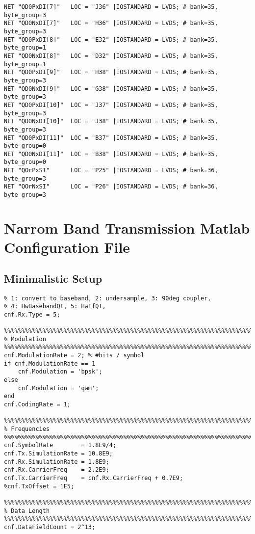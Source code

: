 \begin{appendix}
\begin{verbatim}
NET "QD0PxDI[7]"   LOC = "J36" |IOSTANDARD = LVDS; # bank=35, byte_group=3
NET "QD0NxDI[7]"   LOC = "H36" |IOSTANDARD = LVDS; # bank=35, byte_group=3
NET "QD0PxDI[8]"   LOC = "E32" |IOSTANDARD = LVDS; # bank=35, byte_group=1
NET "QD0NxDI[8]"   LOC = "D32" |IOSTANDARD = LVDS; # bank=35, byte_group=1
NET "QD0PxDI[9]"   LOC = "H38" |IOSTANDARD = LVDS; # bank=35, byte_group=3
NET "QD0NxDI[9]"   LOC = "G38" |IOSTANDARD = LVDS; # bank=35, byte_group=3
NET "QD0PxDI[10]"  LOC = "J37" |IOSTANDARD = LVDS; # bank=35, byte_group=3
NET "QD0NxDI[10]"  LOC = "J38" |IOSTANDARD = LVDS; # bank=35, byte_group=3
NET "QD0PxDI[11]"  LOC = "B37" |IOSTANDARD = LVDS; # bank=35, byte_group=0
NET "QD0NxDI[11]"  LOC = "B38" |IOSTANDARD = LVDS; # bank=35, byte_group=0
NET "QOrPxSI"      LOC = "P25" |IOSTANDARD = LVDS; # bank=36, byte_group=3
NET "QOrNxSI"      LOC = "P26" |IOSTANDARD = LVDS; # bank=36, byte_group=3
\end{verbatim}

\chapter{Narrom Band Transmission Matlab Configuration File}
\label{app:res_450_cnf}

\section{Minimalistic Setup}
\begin{verbatim}
% 1: convert to baseband, 2: undersample, 3: 90deg coupler,
% 4: HwBasebandQI, 5: HwIfQI,
cnf.Rx.Type = 5;

%%%%%%%%%%%%%%%%%%%%%%%%%%%%%%%%%%%%%%%%%%%%%%%%%%%%%%%%%%%%%%%%%%%%%%%%%%%%%%%%
% Modulation
%%%%%%%%%%%%%%%%%%%%%%%%%%%%%%%%%%%%%%%%%%%%%%%%%%%%%%%%%%%%%%%%%%%%%%%%%%%%%%%%
cnf.ModulationRate = 2; % #bits / symbol
if cnf.ModulationRate == 1
    cnf.Modulation = 'bpsk';
else
    cnf.Modulation = 'qam';
end
cnf.CodingRate = 1;

%%%%%%%%%%%%%%%%%%%%%%%%%%%%%%%%%%%%%%%%%%%%%%%%%%%%%%%%%%%%%%%%%%%%%%%%%%%%%%%%
% Frequencies
%%%%%%%%%%%%%%%%%%%%%%%%%%%%%%%%%%%%%%%%%%%%%%%%%%%%%%%%%%%%%%%%%%%%%%%%%%%%%%%%
cnf.SymbolRate        = 1.8E9/4;
cnf.Tx.SimulationRate = 10.8E9;
cnf.Rx.SimulationRate = 1.8E9;
cnf.Rx.CarrierFreq    = 2.2E9;
cnf.Tx.CarrierFreq    = cnf.Rx.CarrierFreq + 0.7E9;
%cnf.TxOffset = 1E5;

%%%%%%%%%%%%%%%%%%%%%%%%%%%%%%%%%%%%%%%%%%%%%%%%%%%%%%%%%%%%%%%%%%%%%%%%%%%%%%%%
% Data Length
%%%%%%%%%%%%%%%%%%%%%%%%%%%%%%%%%%%%%%%%%%%%%%%%%%%%%%%%%%%%%%%%%%%%%%%%%%%%%%%%
cnf.DataFieldCount = 2^13;


\end{verbatim}
\end{appendix}
